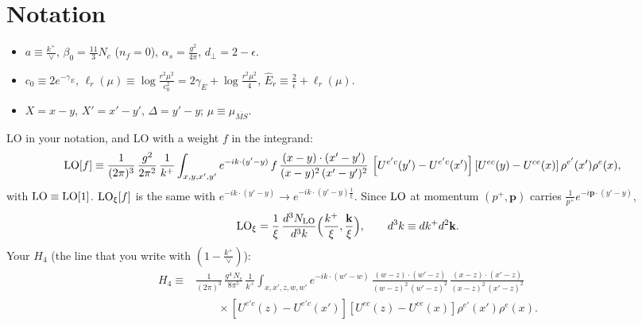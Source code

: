 \documentclass[10pt]{article}
\numberwithin{equation}{section}
\newcommand{\LO}{{\rm LO}}
\begin{document}
\section{Notation}
\begin{itemize}
\item $a\equiv\frac{k^+}{\vee}$, $\beta_0=\frac{11}{3}N_c$ ($n_f=0$), $\alpha_s=\frac{g^2}{4\pi}$, $d_\perp=2-\epsilon$.
\item $c_0\equiv2e^{-\gamma_E}$, $\ell_r(\mu)\equiv\log\frac{r^2\mu^2}{c_0^2}=2\gamma_E+\log\frac{r^2\mu^2}{4}$, $\hat E_r\equiv\frac{2}{\epsilon}+\ell_r(\mu)$.
\item $X=x-y$, $X'=x'-y'$, $\Delta=y'-y$; $\mu\equiv\mu_{\overline{MS}}$.
\end{itemize}
LO in your notation, and LO with a weight $f$ in the integrand:
\begin{align}
\LO[f]&\equiv\frac{1}{(2\pi)^{3}}\,\frac{g^{2}}{2\pi^{2}}\,\frac{1}{k^{+}}\int_{x,y,x',y'}e^{-ik\cdot(y'-y)}\,f\,\frac{(x-y)\cdot (x'-y')}{(x-y)^{2}\,(x'-y')^{2}}\,\left[U^{e'c}(y') - U^{e'c}(x')\right] \left[U^{ec}(y) - U^{ce}(x)\right] \rho^{e'}(x') \rho^{e}(x),\label{eq:LO}
\end{align}
with $\LO\equiv\LO[1]$. ${\rm LO}_\xi[f]$ is the same with $e^{-ik\cdot(y'-y)}\to e^{-ik\cdot(y'-y)\frac1\xi}$. Since $\LO$ at momentum $(p^+,\mathbf p)$ carries $\frac{1}{p^+}e^{-i\mathbf p\cdot(y'-y)}$,
\begin{equation}
{\rm LO}_\xi=\frac{1}{\xi}\,\frac{d^3N_{\rm LO}}{d^3k}\Big(\frac{k^+}{\xi},\frac{\mathbf k}{\xi}\Big),\qquad d^3k\equiv dk^+d^2\mathbf k.\label{eq:LOxi}
\end{equation}
Your $H_4$ (the line that you write with $(1-\frac{k^+}{\vee})$):
\begin{equation}\begin{split}
H_4\equiv{}&\frac{1}{(2\pi)^{3}}\,\frac{g^{4}\,N_{c}}{8\pi^{5}}\,\frac{1}{k^{+}}\int_{x,x',z,w,w'}e^{-ik\cdot (w'-w)}\,\frac{(w-z)\cdot(w'-z)}{(w-z)^{2}\,(w'-z)^{2}}\,\frac{(x-z)\cdot(x'-z)}{(x-z)^{2}\,(x'-z)^{2}}\\&\qquad\times\left[U^{e'c}(z) - U^{e'c}(x')\right]\left[U^{ec}(z) - U^{ce}(x)\right] \rho^{e'}(x') \rho^{e}(x).\end{split}\label{eq:H4}
\end{equation}
\end{document}
